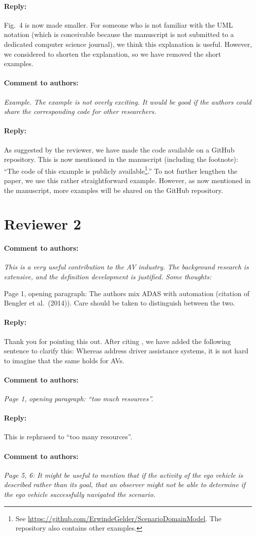 \documentclass[10pt,final,a4paper,oneside,onecolumn]{article}
\newcommand{\toauthor}{\paragraph*{Comment to authors:} \itshape}
\newcommand{\fromauthor}{\paragraph*{Reply:} \normalfont}
\newcommand{\cstart}{\cbstart\color{red}}
\newcommand{\cend}{\cbend\color{black}}
\begin{document}
\fromauthor Fig.~4 is now made smaller. For someone who is not familiar with the UML notation (which is conceivable because the manuscript is not submitted to a dedicated computer science journal), we think this explanation is useful. However, we considered to shorten the explanation, so we have removed the short examples.



\toauthor Example. The example is not overly exciting. It would be good if the authors could share the corresponding code for other researchers.

\fromauthor As suggested by the reviewer, we have made the code available on a GitHub repository. This is now mentioned in the manuscript (including the footnote): ``\cstart The code of this example is publicly available\footnote{\cstart See \url{https://github.com/ErwindeGelder/ScenarioDomainModel}. The repository also contains other examples.\cend}.\cend'' To not further lengthen the paper, we use this rather straightforward example. However, as now mentioned in the manuscript, more examples will be shared on the GitHub repository.



\section*{Reviewer 2}

\toauthor This is a very useful contribution to the AV industry. The background research is extensive, and the definition development is justified. Some thoughts:

Page 1, opening paragraph: The authors mix ADAS with automation (citation of Bengler et al.\ (2014)). Care should be taken to distinguish between the two.

\fromauthor Thank you for pointing this out. After citing \textcite{bengler2014threedecades}, we have added the following sentence to clarify this: \cstart Whereas \textcite{bengler2014threedecades} address driver assistance systems, it is not hard to imagine that the same holds for AVs.\cend



\toauthor Page 1, opening paragraph: ``too much resources''.

\fromauthor This is rephrased to ``too \cstart many \cend resources''.



\toauthor Page 5, 6: It might be useful to mention that if the activity of the ego vehicle is described rather than its goal, that an observer might not be able to determine if the ego vehicle successfully navigated the scenario.
\end{document}
